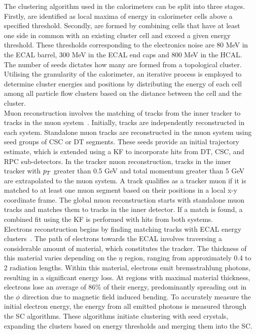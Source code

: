 The clustering algorithm used in the calorimeters can be split into three stages. 
Firstly,  are identified as local maxima of energy in calorimeter cells above a specified threshold. 
Secondly,  are formed by combining cells that have at least one side in common with an existing cluster cell and exceed a given energy threshold. 
These thresholds corresponding to the electronics noise are 80 MeV in the \ac{ECAL} barrel, 300 MeV in the \ac{ECAL} end caps and 800 MeV in the \ac{HCAL}. 
The number of seeds dictates how many  are formed from a topological cluster.
Utilising the granularity of the calorimeter, an iterative process is employed to determine cluster energies and positions by distributing the energy of each cell among all particle flow clusters based on the distance between the cell and the cluster. \\

Muon reconstruction involves the matching of tracks from the inner tracker to tracks in the muon system~\cite{CMS:2012nsv,CMS:2018rym}.
Initially, tracks are independently reconstructed in each system. 
Standalone muon tracks are reconstructed in the muon system using seed groups of \ac{CSC} or \ac{DT} segments. 
These seeds provide an initial trajectory estimate, which is extended using a \ac{KF} to incorporate hits from \ac{DT}, \ac{CSC}, and \ac{RPC} sub-detectors. 
In the tracker muon reconstruction, tracks in the inner tracker with $p_{T}$ greater than 0.5 GeV and total momentum greater than 5 GeV are extrapolated to the muon system. 
A track qualifies as a tracker muon if it is matched to at least one muon segment based on their positions in a local x-y coordinate frame. 
The global muon reconstruction starts with standalone muon tracks and matches them to tracks in the inner detector. 
If a match is found, a combined fit using the \ac{KF} is performed with hits from both systems. \\

Electrons reconstruction begins by finding matching tracks with \ac{ECAL} energy clusters~\cite{CMS:2015xaf}.
The path of electrons towards the \ac{ECAL} involves traversing a considerable amount of material, which constitutes the tracker. 
The thickness of this material varies depending on the $\eta$ region, ranging from approximately 0.4 to 2 radiation lengths. 
Within this material, electrons emit bremsstrahlung photons, resulting in a significant energy loss. 
At regions with maximal material thickness, electrons lose an average of 86\% of their energy, predominantly spreading out in the $\phi$ direction due to magnetic field induced bending. 
To accurately measure the initial electron energy, the energy from all emitted photons is measured through the \ac{SC} algorithms. 
These algorithms initiate clustering with seed crystals, expanding the clusters based on energy thresholds and merging them into the \ac{SC}. \\

